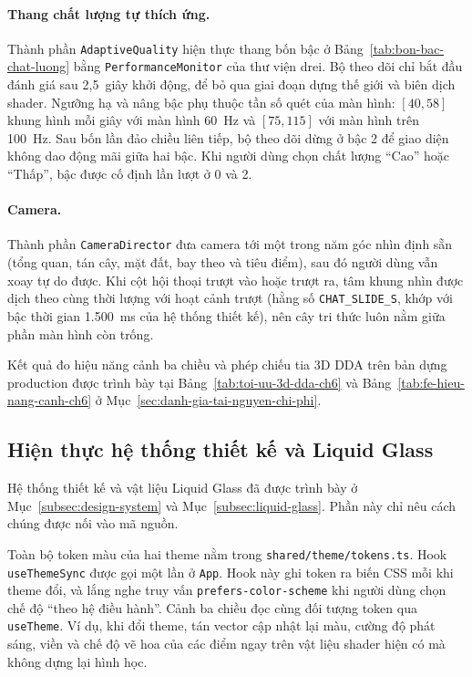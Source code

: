 \paragraph{Thang chất lượng tự thích ứng.} Thành phần \texttt{AdaptiveQuality} hiện thực thang bốn bậc ở Bảng~\ref{tab:bon-bac-chat-luong} bằng \texttt{PerformanceMonitor} của thư viện drei. Bộ theo dõi chỉ bắt đầu đánh giá sau 2,5~giây khởi động, để bỏ qua giai đoạn dựng thế giới và biên dịch shader. Ngưỡng hạ và nâng bậc phụ thuộc tần số quét của màn hình: $[40, 58]$ khung hình mỗi giây với màn hình 60~Hz và $[75, 115]$ với màn hình trên 100~Hz. Sau bốn lần đảo chiều liên tiếp, bộ theo dõi dừng ở bậc 2 để giao diện không dao động mãi giữa hai bậc. Khi người dùng chọn chất lượng ``Cao'' hoặc ``Thấp'', bậc được cố định lần lượt ở 0 và 2.

\paragraph{Camera.} Thành phần \texttt{CameraDirector} đưa camera tới một trong năm góc nhìn định sẵn (tổng quan, tán cây, mặt đất, bay theo và tiêu điểm), sau đó người dùng vẫn xoay tự do được. Khi cột hội thoại trượt vào hoặc trượt ra, tâm khung nhìn được dịch theo cùng thời lượng với hoạt cảnh trượt (hằng số \texttt{CHAT\_\allowbreak{}SLIDE\_\allowbreak{}S}, khớp với bậc thời gian 1.500~ms của hệ thống thiết kế), nên cây tri thức luôn nằm giữa phần màn hình còn trống.

Kết quả đo hiệu năng cảnh ba chiều và phép chiếu tia 3D DDA trên bản dựng production được trình bày tại Bảng~\ref{tab:toi-uu-3d-dda-ch6} và Bảng~\ref{tab:fe-hieu-nang-canh-ch6} ở Mục~\ref{sec:danh-gia-tai-nguyen-chi-phi}.

\subsection{Hiện thực hệ thống thiết kế và Liquid Glass}
\label{subsec:fe-design-system}

Hệ thống thiết kế và vật liệu Liquid Glass đã được trình bày ở Mục~\ref{subsec:design-system} và Mục~\ref{subsec:liquid-glass}. Phần này chỉ nêu cách chúng được nối vào mã nguồn.

\begin{sloppypar}
Toàn bộ token màu của hai theme nằm trong \texttt{shared/\allowbreak{}theme/\allowbreak{}tokens.ts}. Hook \texttt{useThemeSync} được gọi một lần ở \texttt{App}. Hook này ghi token ra biến CSS mỗi khi theme đổi, và lắng nghe truy vấn \texttt{prefers-color-scheme} khi người dùng chọn chế độ ``theo hệ điều hành''. Cảnh ba chiều đọc cùng đối tượng token qua \texttt{useTheme}. Ví dụ, khi đổi theme, tán vector cập nhật lại màu, cường độ phát sáng, viền và chế độ vẽ hoa của các điểm ngay trên vật liệu shader hiện có mà không dựng lại hình học.
\end{sloppypar}

